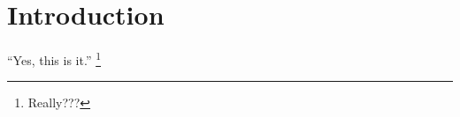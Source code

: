 \documentclass[main]{subfiles}
\begin{document}
\chapter{Introduction}



``Yes, this is it.''
\footnote{Really???}



\lipsum[1-2]
\end{document}
